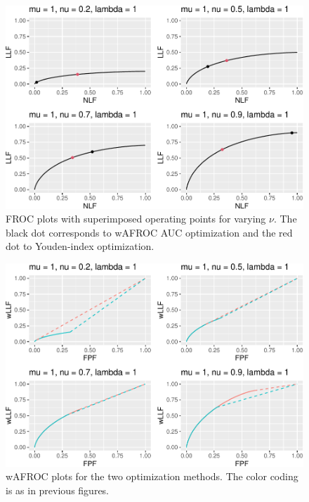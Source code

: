 \documentclass[
]{book}
\begin{document}
\begin{figure}
\centering
\includegraphics{21-optim-op-point_files/figure-latex/optim-op-point-low-performance-vary-nu-vary-all-froc-1.pdf}
\caption{\label{fig:optim-op-point-low-performance-vary-nu-vary-all-froc}FROC plots with superimposed operating points for varying \(\nu\). The black dot corresponds to wAFROC AUC optimization and the red dot to Youden-index optimization.}
\end{figure}

\begin{figure}
\centering
\includegraphics{21-optim-op-point_files/figure-latex/optim-op-point-low-performance-vary-nu-vary-all-wafroc-1.pdf}
\caption{\label{fig:optim-op-point-low-performance-vary-nu-vary-all-wafroc}wAFROC plots for the two optimization methods. The color coding is as in previous figures.}
\end{figure}
\end{document}
